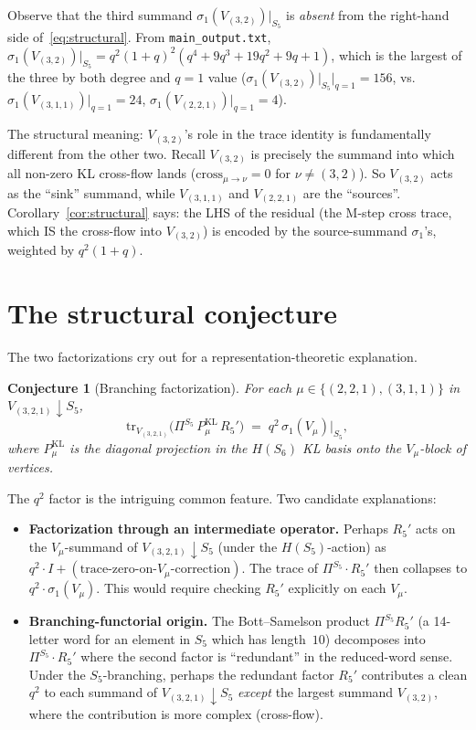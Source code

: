 \documentclass[11pt]{article}
\newtheorem{conjecture}[theorem]{Conjecture}
\theoremstyle{definition}
\begin{document}
Observe that the third summand $\sigma_1(V_{(3,2)})\big|_{S_5}$ is \emph{absent} from the right-hand side of~\eqref{eq:structural}. From \texttt{main\_output.txt}, $\sigma_1(V_{(3,2)})\big|_{S_5} = q^2(1+q)^2(q^4+9q^3+19q^2+9q+1)$, which is the largest of the three by both degree and $q=1$ value ($\sigma_1(V_{(3,2)})\big|_{S_5}\big|_{q=1} = 156$, vs.\ $\sigma_1(V_{(3,1,1)})\big|_{q=1} = 24$, $\sigma_1(V_{(2,2,1)})\big|_{q=1} = 4$).

The structural meaning: $V_{(3,2)}$'s role in the trace identity is fundamentally different from the other two. Recall $V_{(3,2)}$ is precisely the summand into which all non-zero KL cross-flow lands ($\mathrm{cross}_{\mu\to\nu} = 0$ for $\nu \neq (3,2)$). So $V_{(3,2)}$ acts as the ``sink'' summand, while $V_{(3,1,1)}$ and $V_{(2,2,1)}$ are the ``sources''. Corollary~\ref{cor:structural} says: the LHS of the residual (the M-step cross trace, which IS the cross-flow into $V_{(3,2)}$) is encoded by the source-summand $\sigma_1$'s, weighted by $q^2(1+q)$.

\section{The structural conjecture}

The two factorizations cry out for a representation-theoretic explanation.

\begin{conjecture}[Branching factorization]\label{conj:factor}
For each $\mu \in \{(2,2,1), (3,1,1)\}$ in $V_{(3,2,1)}{\downarrow}S_5$,
\[
\mathrm{tr}_{V_{(3,2,1)}}\!\bigl(\Pi^{S_5}\, P_\mu^{\mathrm{KL}}\, R_5'\bigr) \;=\; q^2\, \sigma_1(V_\mu)\big|_{S_5},
\]
where $P_\mu^{\mathrm{KL}}$ is the diagonal projection in the $H(S_6)$ KL basis onto the $V_\mu$-block of vertices.
\end{conjecture}

The $q^2$ factor is the intriguing common feature. Two candidate explanations:

\begin{itemize}[leftmargin=2em,topsep=0.3em,itemsep=0.2em]
\item \textbf{Factorization through an intermediate operator.} Perhaps $R_5'$ acts on the $V_\mu$-summand of $V_{(3,2,1)}{\downarrow}S_5$ (under the $H(S_5)$-action) as $q^2 \cdot I + (\text{trace-zero-on-}V_\mu\text{-correction})$. The trace of $\Pi^{S_5} \cdot R_5'$ then collapses to $q^2 \cdot \sigma_1(V_\mu)$. This would require checking $R_5'$ explicitly on each $V_\mu$.

\item \textbf{Branching-functorial origin.} The Bott--Samelson product $\Pi^{S_5} R_5'$ (a 14-letter word for an element in $S_5$ which has length~$10$) decomposes into $\Pi^{S_5} \cdot R_5'$ where the second factor is ``redundant'' in the reduced-word sense. Under the $S_5$-branching, perhaps the redundant factor $R_5'$ contributes a clean $q^2$ to each summand of $V_{(3,2,1)}{\downarrow}S_5$ \emph{except} the largest summand $V_{(3,2)}$, where the contribution is more complex (cross-flow).
\end{itemize}
\end{document}
